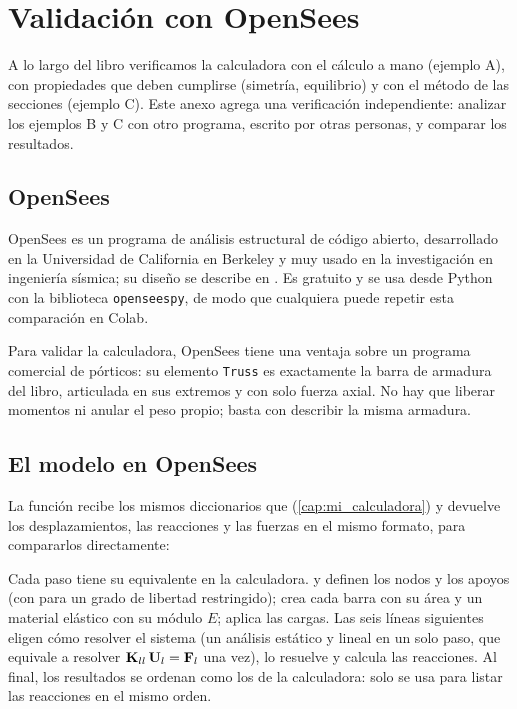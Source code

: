 \chapter{Validación con OpenSees}\label{cap:validacion}

A lo largo del libro verificamos la calculadora con el cálculo a mano
(ejemplo A), con propiedades que deben cumplirse (simetría, equilibrio) y con
el método de las secciones (ejemplo C). Este anexo agrega una verificación
independiente: analizar los ejemplos B y C con otro programa, escrito por
otras personas, y comparar los resultados.

\section{OpenSees}\label{sec:d_opensees}

OpenSees es un programa de análisis estructural de código abierto,
desarrollado en la Universidad de California en Berkeley y muy usado en la
investigación en ingeniería sísmica; su diseño se describe en
\textcite{mckenna2011}. Es gratuito y se usa desde Python con la biblioteca
\texttt{openseespy}, de modo que cualquiera puede repetir esta comparación en
Colab.

Para validar la calculadora, OpenSees tiene una ventaja sobre un programa
comercial de pórticos: su elemento \texttt{Truss} es exactamente la barra de
armadura del libro, articulada en sus extremos y con solo fuerza axial. No hay
que liberar momentos ni anular el peso propio; basta con describir la misma
armadura.

\section{El modelo en OpenSees}\label{sec:d_modelo}

La función  recibe los mismos diccionarios que
 (\cref{cap:mi_calculadora}) y devuelve los
desplazamientos, las reacciones y las fuerzas en el mismo formato, para
compararlos directamente:


Cada paso tiene su equivalente en la calculadora.  y
 definen los nodos y los apoyos (con  para un grado de
libertad restringido);  crea cada barra con su
área y un material elástico con su módulo $E$;  aplica las
cargas. Las seis líneas siguientes eligen cómo resolver el sistema (un
análisis estático y lineal en un solo paso, que equivale a resolver
$\mathbf{K}_{ll}\,\mathbf{U}_l = \mathbf{F}_l$ una vez),  lo resuelve y
 calcula las reacciones. Al final, los resultados se ordenan como
los de la calculadora:  solo se usa para listar las
reacciones en el mismo orden.


